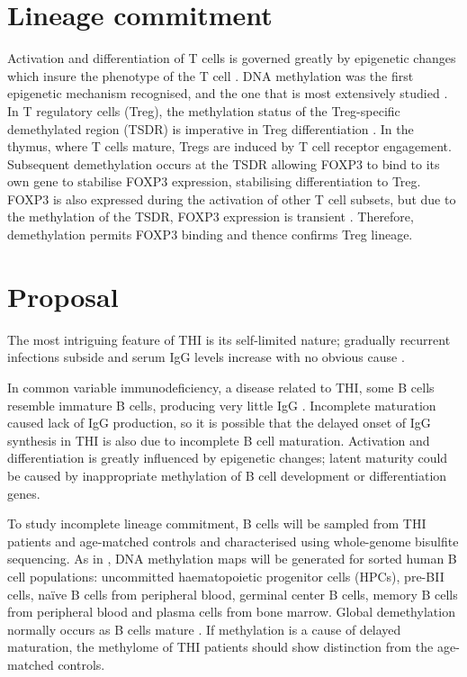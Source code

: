 \documentclass[12pt]{article}
\newcommand{\naive}{na\"{i}ve }
\begin{document}
	\section{Lineage commitment}

		Activation and differentiation of T cells is governed greatly by epigenetic changes which insure the phenotype of the T cell \citep{Zeng13}.
		DNA methylation was the first epigenetic mechanism recognised, and the one that is most extensively studied \citep{Begin14}. 
		In T regulatory cells (Treg), the methylation status of the Treg-specific demethylated region (TSDR) is imperative in Treg differentiation \citep{Polansky08}.
		In the thymus, where T cells mature, Tregs are induced by T cell receptor engagement. 
		Subsequent demethylation occurs at the TSDR allowing FOXP3 to bind to its own gene to stabilise FOXP3 expression, stabilising differentiation to Treg.
		FOXP3 is also expressed during the activation of other T cell subsets, but due to the methylation of the TSDR, FOXP3 expression is transient \citep{Ohkura13}.
		Therefore, demethylation permits FOXP3 binding and thence confirms Treg lineage.
		
	\section{Proposal}
	
		The most intriguing feature of THI is its self-limited nature; gradually recurrent infections subside and serum IgG levels increase with no obvious cause  \citep{Tiller78,Soothill68,Siegel81,McGeady87,Dressler89,Kowalczyk97,Dalal98}. 
		
		In common variable immunodeficiency, a disease related to THI, some B cells resemble immature B cells, producing very little IgG \citep{Fiorilli86}. 
		Incomplete maturation caused lack of IgG production, so it is possible that the delayed onset of IgG synthesis in THI is also due to incomplete B cell maturation.
		Activation and differentiation is greatly influenced by epigenetic changes; latent maturity could be caused by inappropriate methylation of B cell development or differentiation genes. 

		To study incomplete lineage commitment, B cells will be sampled from THI patients and age-matched controls and characterised using whole-genome bisulfite sequencing.
		As in \citet{Kulis15}, DNA methylation maps will be generated for sorted human B cell populations: uncommitted haematopoietic progenitor cells (HPCs), pre-BII cells, \naive B cells from peripheral blood, germinal center B cells, memory B cells from peripheral blood and plasma cells from bone marrow.
		Global demethylation normally occurs as B cells mature \citep{Oakes16}. 
		If methylation is a cause of delayed maturation, the methylome of THI patients should show distinction from the age-matched controls.
		
		
			
	
	
	\newpage
	
	
	
\end{document}
